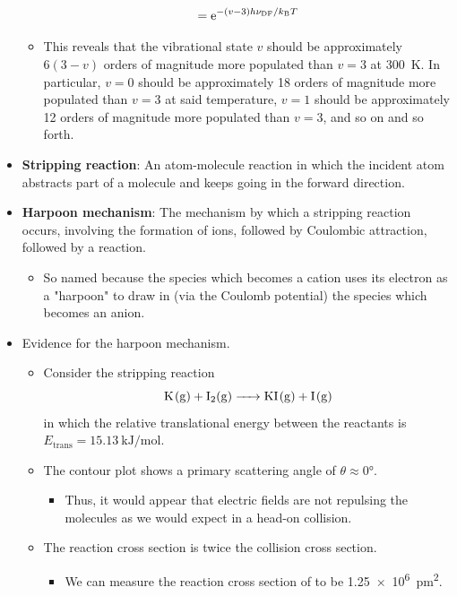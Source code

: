 \documentclass[../notes.tex]{subfiles}
\begin{document}
\begin{itemize}
\begin{itemize}
\begin{equation*}
            = \e[-(v-3)h\nu_{\ce{DF}}/\kB T]
        \end{equation*}
        \item This reveals that the vibrational state $v$ should be approximately $6(3-v)$ orders of magnitude more populated than $v=3$ at \SI{300}{\kelvin}. In particular, $v=0$ should be approximately 18 orders of magnitude more populated than $v=3$ at said temperature, $v=1$ should be approximately 12 orders of magnitude more populated than $v=3$, and so on and so forth.
    \end{itemize}
    \item \textbf{Stripping reaction}: An atom-molecule reaction in which the incident atom abstracts part of a molecule and keeps going in the forward direction.
    \item \textbf{Harpoon mechanism}: The mechanism by which a stripping reaction occurs, involving the formation of ions, followed by Coulombic attraction, followed by a reaction.
    \begin{itemize}
        \item So named because the species which becomes a cation uses its electron as a "harpoon" to draw in (via the Coulomb potential) the species which becomes an anion.
    \end{itemize}
    \item Evidence for the harpoon mechanism.
    \begin{itemize}
        \item Consider the stripping reaction
        \begin{equation*}
            \ce{K(g) + I2(g) -> KI(g) + I(g)}
        \end{equation*}
        in which the relative translational energy between the reactants is $E_\text{trans}=\SI{15.13}{\kilo\joule\per\mole}$.
        \item The contour plot shows a primary scattering angle of $\theta\approx\ang{0}$.
        \begin{itemize}
            \item Thus, it would appear that electric fields are not repulsing the molecules as we would expect in a head-on collision.
        \end{itemize}
        \item The reaction cross section is twice the collision cross section.
        \begin{itemize}
            \item We can measure the reaction cross section of  to be \SI{1.25e6}{\pico\meter\squared}.

\end{itemize}
\end{itemize}
\end{itemize}
\end{document}
